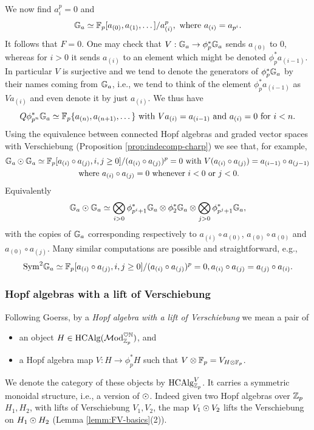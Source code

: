 \begin{example} \label{ex:Ga-hotimes-Ga}
We now find $a_i^p = 0$ and \[ {\mathbb G}_a \simeq \mathbb{F}_p[a_{(0)}, a_{(1)}, \dots]/a_{(i)}^p, \text{ where } a_{(i)} = a_{p^i}. \]
It follows that $F=0$.
One may check that $V: {\mathbb G}_a \to \phi_p^* {\mathbb G}_a$ sends $a_{(0)}$ to $0$, whereas for $i>0$ it sends $a_{(i)}$ to an element which might be denoted $\phi_p^*a_{(i-1)}$.
In particular $V$ is surjective and we tend to denote the generators of $\phi_p^* {\mathbb G}_a$ by their names coming from ${\mathbb G}_a$, i.e., we tend to think of the element $\phi_p^*a_{(i-1)}$ as $Va_{(i)}$ and even denote it by just $a_{(i)}$.
We thus have \[ Q\phi_{p^n}^*{\mathbb G}_a \simeq \mathbb{F}_p\{a_{(n)}, a_{(n+1)}, \dots\} \text{ with } Va_{(i)} = a_{(i-1)} \text{ and } a_{(i)} = 0 \text{ for } i<n. \]
Using the equivalence between connected Hopf algebras and graded vector spaces with Verschiebung (Proposition \ref{prop:indecomp-charp}) we see that, for example, \begin{gather*} {\mathbb G}_a \odot {\mathbb G}_a \simeq \mathbb{F}_p[a_{(i)} \circ a_{(j)}, i,j \ge 0]/(a_{(i)} \circ a_{(j)})^p = 0 \text{ with } V(a_{(i)} \circ a_{(j)}) = a_{(i-1)} \circ a_{(j-1)} \\ \text{ where } a_{(i)} \circ a_{(j)} = 0 \text{ whenever $i<0$ or $j<0$}. \end{gather*}
Equivalently \[ {\mathbb G}_a \odot {\mathbb G}_a \simeq \bigotimes_{i > 0} \phi_{p^i+1}^*{\mathbb G}_a \otimes \phi_2^*{\mathbb G}_a \otimes \bigotimes_{j > 0} \phi_{p^j+1}^*{\mathbb G}_a, \] with the copies of ${\mathbb G}_a$ corresponding respectively to $a_{(i)} \circ a_{(0)}$, $a_{(0)} \circ a_{(0)}$ and $a_{(0)} \circ a_{(j)}$.
Many similar computations are possible and straightforward, e.g., \[ \mathrm{Sym}^2 {\mathbb G}_a \simeq \mathbb{F}_p[a_{(i)} \circ a_{(j)}, i,j \ge 0]/(a_{(i)} \circ a_{(j)})^p = 0,a_{(i)} \circ a_{(j)} = a_{(j)} \circ a_{(i)}. \]
\end{example}

\subsubsection{Hopf algebras with a lift of Verschiebung} \label{subsec:lift-of-v}
Following Goerss, by a \emph{Hopf algebra with a lift of Verschiebung} we mean a pair of
\begin{itemize}
\item an object $H \in \mathrm{HCAlg}(\mathcal{M}\mathrm{od}_{\mathbb{Z}_p}^{\heartsuit\mathbb{N}})$, and
\item a Hopf algebra map $V: H \to \phi_p^* H$ such that $V \otimes \mathbb{F}_p = V_{H \otimes \mathbb{F}_p}$.
\end{itemize}
We denote the category of these objects by $\mathrm{HCAlg}_{\mathbb{Z}_p}^V$.
It carries a symmetric monoidal structure, i.e., a version of $\odot$.
Indeed given two Hopf algebras over $\mathbb{Z}_p$ $H_1, H_2$, with lifts of Verschiebung $V_1, V_2$, the map $V_1 \odot V_2$ lifts the Verschiebung on $H_1 \odot H_2$ (Lemma \ref{lemm:FV-basics}(2)).

